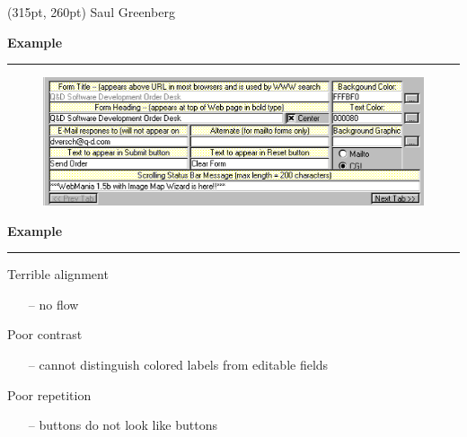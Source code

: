 \documentclass[pdf]{beamer}
\newcommand{\transpt}[2][35]{\color{fg!#1}#2}
\begin{document}
{{{{{{{{{{{{\begin{frame}
\begin{tabular}{cc}
\end{tabular}

\begin{textblock*}{60pt}(315pt, 260pt)
\tiny{\transpt{Saul Greenberg}}
\end{textblock*}
\end{frame}



{
\begin{frame}
{\textbf{Example}}{\textcolor{red}{\rule{12cm}{1.2pt}}}

	\begin{figure}
        \includegraphics[scale=0.45]{15_picture.png}
    \end{figure}

\vspace{80px}\hspace{-25px}\fontsize{8pt}{1pt}\selectfont{\color{gray}{Webforms}} 
\end{frame}



{
\begin{frame}
{\textbf{Example}}{\textcolor{red}{\rule{12cm}{1.2pt}}}

    {Terrible alignment}
	\begin{itemize}
      	\item[--]\small{no flow}
      	\newline
    \end{itemize} 
    
    {Poor contrast}
	\begin{itemize}
      	\item[--]\small{cannot distinguish colored labels from editable fields}
      	\newline
    \end{itemize} 
    
    {Poor repetition}
	\begin{itemize}
      	\item[--]\small{buttons do not look like buttons}
      	\newline
    \end{itemize} 
    

\end{frame}}}}}}}}}}}}}}}
\end{document}
